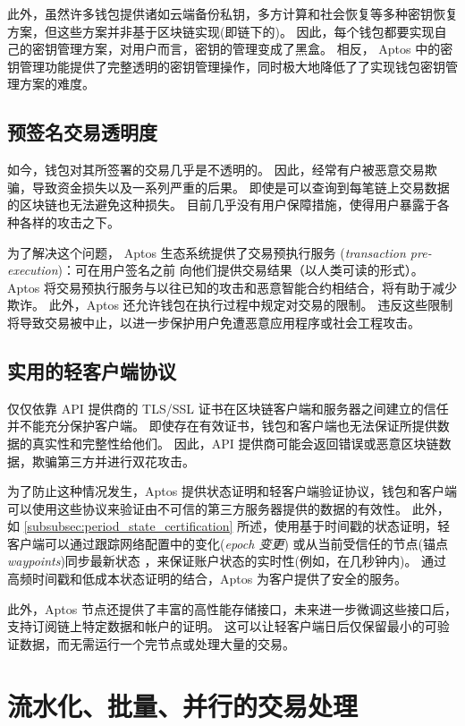 \documentclass{article}
\begin{document}
此外，虽然许多钱包提供诸如云端备份私钥，多方计算和社会恢复等多种密钥恢复方案，但这些方案并非基于区块链实现(即链下的)。 因此，每个钱包都要实现自己的密钥管理方案，对用户而言，密钥的管理变成了黑盒。 相反， Aptos 中的密钥管理功能提供了完整透明的密钥管理操作，同时极大地降低了了实现钱包密钥管理方案的难度。

\subsection{预签名交易透明度}

如今，钱包对其所签署的交易几乎是不透明的。 因此，经常有户被恶意交易欺骗，导致资金损失以及一系列严重的后果。 即使是可以查询到每笔链上交易数据的区块链也无法避免这种损失。 目前几乎没有用户保障措施，使得用户暴露于各种各样的攻击之下。

为了解决这个问题， Aptos 生态系统提供了交易预执行服务 (\emph{transaction pre-execution})：可在用户签名之前 向他们提供交易结果（以人类可读的形式）。 Aptos 将交易预执行服务与以往已知的攻击和恶意智能合约相结合，将有助于减少欺诈。 此外，Aptos 还允许钱包在执行过程中规定对交易的限制。 违反这些限制将导致交易被中止，以进一步保护用户免遭恶意应用程序或社会工程攻击。

\subsection{实用的轻客户端协议}

仅仅依靠 API 提供商的 TLS/SSL 证书在区块链客户端和服务器之间建立的信任并不能充分保护客户端。 即使存在有效证书，钱包和客户端也无法保证所提供数据的真实性和完整性给他们。 因此，API 提供商可能会返回错误或恶意区块链数据，欺骗第三方并进行双花攻击。

为了防止这种情况发生，Aptos 提供状态证明和轻客户端验证协议，钱包和客户端可以使用这些协议来验证由不可信的第三方服务器提供的数据的有效性。 此外，如 \ref{subsubsec:period_state_certification} 所述，使用基于时间戳的状态证明，轻客户端可以通过跟踪网络配置中的变化(\emph{epoch 变更}) 或从当前受信任的节点(锚点 \emph{waypoints})同步最新状态 \cite{waypoints}，来保证账户状态的实时性(例如，在几秒钟内)。 通过高频时间戳和低成本状态证明的结合，Aptos 为客户提供了安全的服务。

此外，Aptos 节点还提供了丰富的高性能存储接口，未来进一步微调这些接口后，支持订阅链上特定数据和帐户的证明。 这可以让轻客户端日后仅保留最小的可验证数据，而无需运行一个完节点或处理大量的交易。


\section{流水化、批量、并行的交易处理}
\label{sec:pipelining_batching}
\end{document}

